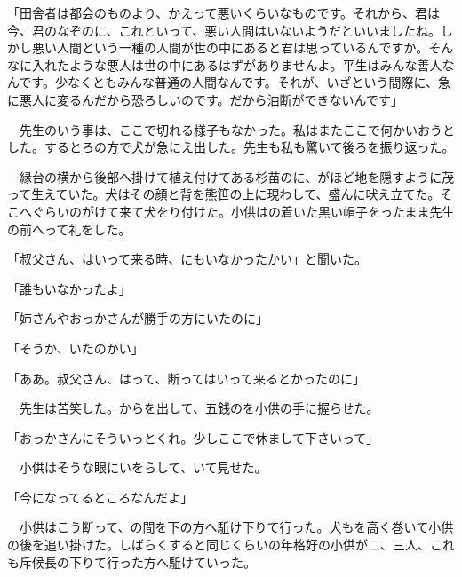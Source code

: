 \documentclass[a4j,onecolumn]{tarticle}
\begin{document}
「田舎者は都会のものより、\hbox{}かえって悪いくらいなものです。\hbox{}それから、\hbox{}君は今、\hbox{}君のなぞのに、\hbox{}これといって、\hbox{}悪い人間はいないようだといいましたね。\hbox{}しかし悪い人間という一種の人間が世の中にあると君は思っているんですか。\hbox{}そんなに入れたような悪人は世の中にあるはずがありませんよ。\hbox{}平生はみんな善人なんです。\hbox{}少なくともみんな普通の人間なんです。\hbox{}それが、\hbox{}いざという間際に、\hbox{}急に悪人に変るんだから恐ろしいのです。\hbox{}だから油断ができないんです」\par{}
　先生のいう事は、\hbox{}ここで切れる様子もなかった。\hbox{}私はまたここで何かいおうとした。\hbox{}するとろの方で犬が急にえ出した。\hbox{}先生も私も驚いて後ろを振り返った。\hbox{}\par{}
　縁台の横から後部へ掛けて植え付けてある杉苗のに、\hbox{}がほど地を隠すように茂って生えていた。\hbox{}犬はその顔と背を熊笹の上に現わして、\hbox{}盛んに吠え立てた。\hbox{}そこへぐらいのがけて来て犬をり付けた。\hbox{}小供はの着いた黒い帽子をったまま先生の前へって礼をした。\hbox{}\par{}
「叔父さん、\hbox{}はいって来る時、\hbox{}にもいなかったかい」と聞いた。\hbox{}\par{}
「誰もいなかったよ」\par{}
「姉さんやおっかさんが勝手の方にいたのに」\par{}
「そうか、\hbox{}いたのかい」\par{}
「ああ。\hbox{}叔父さん、\hbox{}はって、\hbox{}断ってはいって来るとかったのに」\par{}
　先生は苦笑した。\hbox{}からを出して、\hbox{}五銭のを小供の手に握らせた。\hbox{}\par{}
「おっかさんにそういっとくれ。\hbox{}少しここで休まして下さいって」\par{}
　小供はそうな眼にいをらして、\hbox{}いて見せた。\hbox{}\par{}
「今になってるところなんだよ」\par{}
  　小供はこう断って、\hbox{}の間を下の方へ駈け下りて行った。\hbox{}犬もを高く巻いて小供の後を追い掛けた。\hbox{}しばらくすると同じくらいの年格好の小供が二、\hbox{}三人、\hbox{}これも斥候長の下りて行った方へ駈けていった。\hbox{}\par{}\par{}
\end{document}
